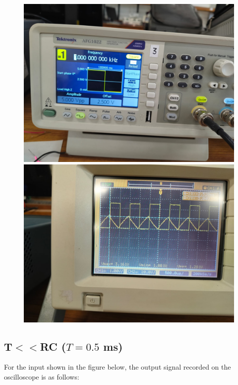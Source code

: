 \documentclass[a4paper,12pt]{article}
\begin{document}
\begin{figure}[h]
    \centering
    \begin{minipage}{0.45\textwidth}
        \centering
        \includegraphics[width=\textwidth]{figs/C1kpara.jpeg}
    \end{minipage}\hfill
    \begin{minipage}{0.45\textwidth}
        \centering
        \includegraphics[width=\textwidth]{figs/C1kplot.jpeg}
    \end{minipage}
\end{figure}



\subsection{T$<<$RC ($T=0.5$ ms)}
For the input shown in the figure below, the output signal recorded on the oscilloscope is as follows:
\end{document}
